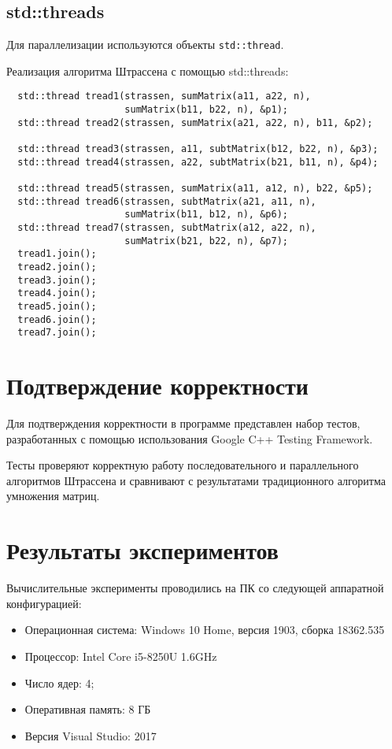 \documentclass{article}
\begin{document}
\subsection{std::threads}
Для параллелизации используются объекты \verb|std::thread|.

\par  Реализация алгоритма Штрассена с помощью std::threads:

\vspace{10pt}
\begin{lstlisting}
  std::thread tread1(strassen, sumMatrix(a11, a22, n),
                     sumMatrix(b11, b22, n), &p1);
  std::thread tread2(strassen, sumMatrix(a21, a22, n), b11, &p2);
  
  std::thread tread3(strassen, a11, subtMatrix(b12, b22, n), &p3);
  std::thread tread4(strassen, a22, subtMatrix(b21, b11, n), &p4);
  
  std::thread tread5(strassen, sumMatrix(a11, a12, n), b22, &p5);
  std::thread tread6(strassen, subtMatrix(a21, a11, n),
                     sumMatrix(b11, b12, n), &p6);
  std::thread tread7(strassen, subtMatrix(a12, a22, n),
                     sumMatrix(b21, b22, n), &p7);
  tread1.join();
  tread2.join();
  tread3.join();
  tread4.join();
  tread5.join();
  tread6.join();
  tread7.join();
\end{lstlisting}
\vspace{-25pt}

\newpage

\section{Подтверждение корректности}
Для подтверждения корректности в программе представлен набор тестов, разработанных с помощью использования Google C++ Testing Framework.


\par Тесты проверяют корректную работу последовательного и параллельного алгоритмов Штрассена и сравнивают с результатами традиционного алгоритма умножения матриц.


\newpage

\section{Результаты экспериментов}
Вычислительные эксперименты проводились на ПК со следующей аппаратной конфигурацией:

\begin{itemize}
\item Операционная система: Windows 10 Home, версия 1903, сборка 18362.535
\item Процессор: Intel Core i5-8250U 1.6GHz
\item Число ядер: 4;
\item Оперативная память: 8 ГБ
\item Версия Visual Studio: 2017
\end{itemize}
\end{document}
